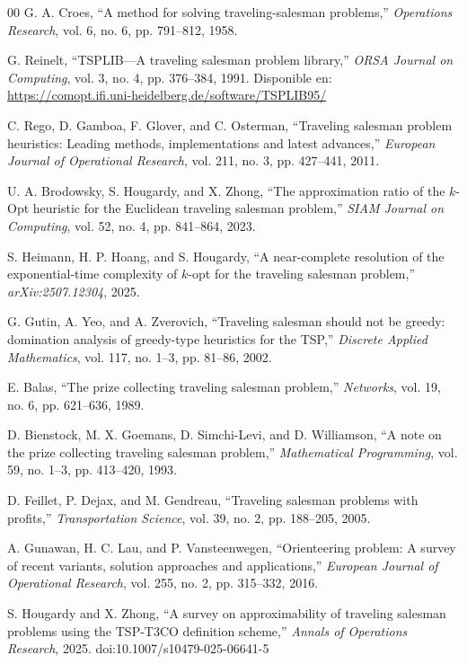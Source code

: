 \documentclass[conference]{IEEEtran}
\begin{document}
\begin{thebibliography}{00}
 G. A. Croes, 
``A method for solving traveling-salesman problems,'' 
\textit{Operations Research}, vol. 6, no. 6, pp. 791--812, 1958.

 G. Reinelt,
``TSPLIB—A traveling salesman problem library,''
\textit{ORSA Journal on Computing}, vol. 3, no. 4, pp. 376--384, 1991.
Disponible en: \url{https://comopt.ifi.uni-heidelberg.de/software/TSPLIB95/}

 C. Rego, D. Gamboa, F. Glover, and C. Osterman,
``Traveling salesman problem heuristics: Leading methods, implementations and latest advances,''
\textit{European Journal of Operational Research}, vol. 211, no. 3, pp. 427--441, 2011.

 U. A. Brodowsky, S. Hougardy, and X. Zhong,
``The approximation ratio of the $k$-Opt heuristic for the Euclidean traveling salesman problem,''
\textit{SIAM Journal on Computing}, vol. 52, no. 4, pp. 841--864, 2023.

 S. Heimann, H. P. Hoang, and S. Hougardy,
``A near-complete resolution of the exponential-time complexity of $k$-opt for the traveling salesman problem,''
\textit{arXiv:2507.12304}, 2025.

 G. Gutin, A. Yeo, and A. Zverovich,
``Traveling salesman should not be greedy: domination analysis of greedy-type heuristics for the TSP,''
\textit{Discrete Applied Mathematics}, vol. 117, no. 1--3, pp. 81--86, 2002.

 E. Balas,
``The prize collecting traveling salesman problem,''
\textit{Networks}, vol. 19, no. 6, pp. 621--636, 1989.

 D. Bienstock, M. X. Goemans, D. Simchi-Levi, and D. Williamson,
``A note on the prize collecting traveling salesman problem,''
\textit{Mathematical Programming}, vol. 59, no. 1--3, pp. 413--420, 1993.

 D. Feillet, P. Dejax, and M. Gendreau,
``Traveling salesman problems with profits,''
\textit{Transportation Science}, vol. 39, no. 2, pp. 188--205, 2005.

 A. Gunawan, H. C. Lau, and P. Vansteenwegen,
``Orienteering problem: A survey of recent variants, solution approaches and applications,''
\textit{European Journal of Operational Research}, vol. 255, no. 2, pp. 315--332, 2016.

 S. Hougardy and X. Zhong,
``A survey on approximability of traveling salesman problems using the TSP-T3CO definition scheme,''
\textit{Annals of Operations Research}, 2025. doi:10.1007/s10479-025-06641-5


\end{thebibliography}
\end{document}

